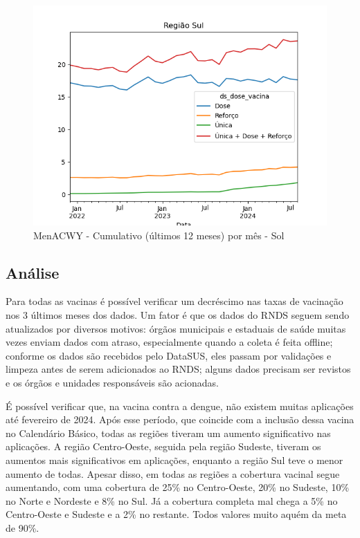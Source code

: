 \documentclass[12pt]{article}
\begin{document}
\begin{figure}[H]
    \centering
    \includegraphics[width=0.85\linewidth]{imagens/MenACWY-Sul-Cumulativo-mes}
    \caption{MenACWY - Cumulativo (últimos 12 meses) por mês - Sol}
    \label{fig:MenACWY-sul-cumulativo-mes}
\end{figure}


\subsection{Análise}
Para todas as vacinas é possível verificar um decréscimo nas taxas de vacinação nos 3 últimos meses dos dados. Um fator é que os dados do RNDS seguem sendo atualizados por diversos motivos: órgãos municipais e estaduais de saúde muitas vezes enviam dados com atraso, especialmente quando a coleta é feita offline; conforme os dados são recebidos pelo DataSUS, eles passam por validações e limpeza antes de serem adicionados ao RNDS; alguns dados precisam ser revistos e os órgãos e unidades responsáveis são acionadas.

É possível verificar que, na vacina contra a dengue, não existem muitas aplicações até fevereiro de 2024. Após esse período, que coincide com a inclusão dessa vacina no Calendário Básico, todas as regiões tiveram um aumento significativo nas aplicações. A região Centro-Oeste, seguida pela região Sudeste, tiveram os aumentos mais significativos em aplicações, enquanto a região Sul teve o menor aumento de todas. Apesar disso, em todas as regiões a cobertura vacinal segue aumentando, com uma cobertura de 25\% no Centro-Oeste, 20\% no Sudeste, 10\% no Norte e Nordeste e 8\% no Sul. Já a cobertura completa mal chega a 5\% no Centro-Oeste e Sudeste e a 2\% no restante. Todos valores muito aquém da meta de 90\%.
\end{document}
